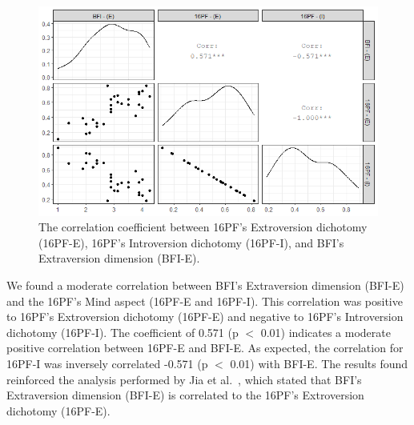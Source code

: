 \begin{figure}[!ht]
\centerline{\includegraphics[scale=0.40]{Imagens/n1.PNG}}
\caption{The correlation coefficient between 16PF's Extroversion dichotomy (16PF-E), 16PF's Introversion dichotomy (16PF-I), and BFI's Extraversion dimension (BFI-E).}
\label{fig2}
\end{figure}

We found a moderate correlation between BFI's Extraversion dimension (BFI-E) and the 16PF's Mind aspect (16PF-E and 16PF-I). This correlation was positive to 16PF's Extroversion dichotomy (16PF-E) and negative to 16PF's Introversion dichotomy (16PF-I). The coefficient of 0.571 (p $<$  0.01) indicates a moderate positive correlation between 16PF-E and BFI-E. As expected, the correlation for 16PF-I was inversely correlated -0.571 (p $<$  0.01) with BFI-E. The results found reinforced the analysis performed by Jia et al.~\cite{jia2015comparative, balijepally2006assessing}, which stated that BFI's Extraversion dimension (BFI-E) is correlated to the 16PF's Extroversion dichotomy (16PF-E). 


